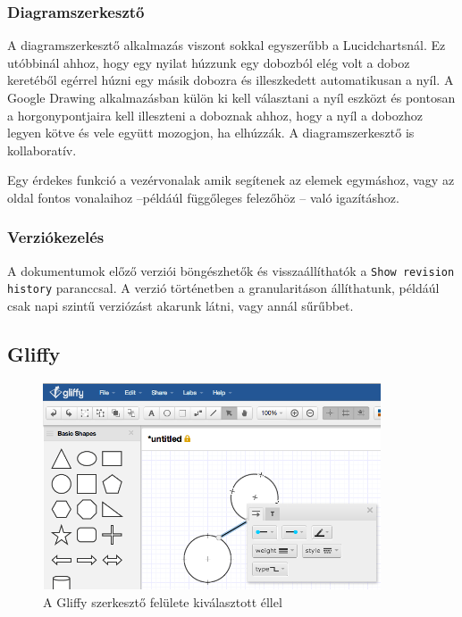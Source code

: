 \subsubsection{Diagramszerkesztő}

A diagramszerkesztő alkalmazás viszont sokkal egyszerűbb a Lucidchartsnál. Ez utóbbinál ahhoz, hogy egy nyilat húzzunk egy dobozból elég volt a doboz keretéből egérrel húzni egy másik dobozra és illeszkedett automatikusan a nyíl. A Google Drawing alkalmazásban külön ki kell választani a nyíl eszközt és pontosan a horgonypontjaira kell illeszteni a doboznak ahhoz, hogy a nyíl a dobozhoz legyen kötve és vele együtt mozogjon, ha elhúzzák. A diagramszerkesztő is kollaboratív.

Egy érdekes funkció a vezérvonalak amik segítenek az elemek egymáshoz, vagy az oldal fontos vonalaihoz --példáúl függőleges felezőhöz -- való igazításhoz.

\subsubsection{Verziókezelés}

A dokumentumok előző verziói böngészhetők és visszaállíthatók a \lstinline{Show revision history} paranccsal. A verzió történetben a granularitáson állíthatunk, példáúl csak napi szintű verziózást akarunk látni, vagy annál sűrűbbet.

\subsection{Gliffy}

\begin{figure}[!ht]
\centering
\includegraphics[width=10cm,keepaspectratio]{figures/gliffy.png}
\caption{A Gliffy szerkesztő felülete kiválasztott éllel}
\label{fig:gliffyeditor}
\end{figure}

